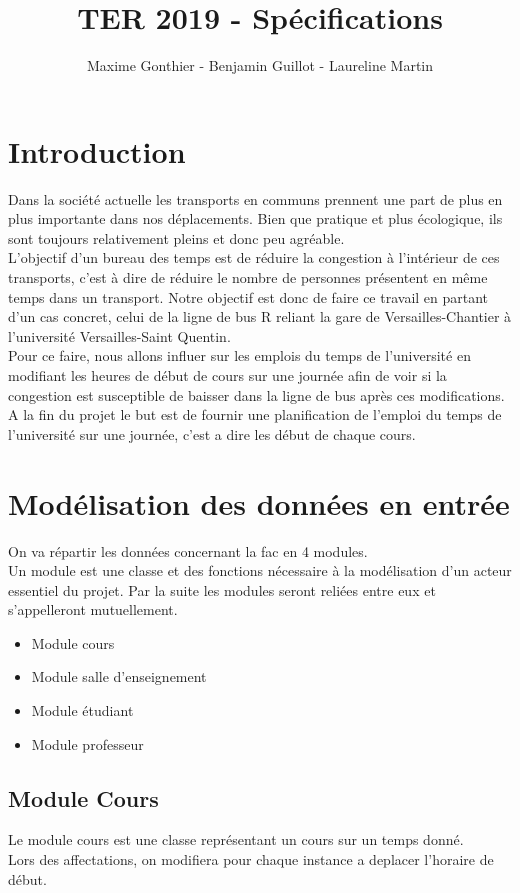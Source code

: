 \documentclass[a4paper,11pt]{article}
\title{TER 2019 - Spécifications}
\author{Maxime Gonthier - Benjamin Guillot - Laureline Martin}
\begin{document}
	\clearpage
	\maketitle

\newpage
\tableofcontents

\newpage
\section{Introduction}
Dans la société actuelle les transports en communs prennent une part de plus en plus importante dans nos déplacements. Bien que pratique et plus écologique, ils sont toujours relativement pleins et donc peu agréable.\\
 L'objectif d'un bureau des temps est de réduire la congestion à l'intérieur de ces transports, c'est à dire de réduire le nombre de personnes présentent en même temps dans un transport. 
Notre objectif est donc de faire ce travail en partant d'un cas concret, celui de la ligne de bus R reliant la gare de Versailles-Chantier à l'université Versailles-Saint Quentin.\\
Pour ce faire, nous allons influer sur les emplois du temps de l'université en modifiant les heures de début de cours sur une journée afin de voir si la congestion est susceptible de baisser dans la ligne de bus après ces modifications.\\
A la fin du projet le but est de fournir une planification de l'emploi du temps de l'université sur une journée, c'est a dire les début de chaque cours.
\section{Modélisation des données en entrée}
	On va répartir les données concernant la fac en 4 modules.\\
	Un module est une classe et des fonctions nécessaire à la modélisation d'un acteur essentiel du projet. Par la suite les modules seront reliées entre eux et s'appelleront mutuellement.
	\begin{itemize}
		\item Module cours
		\item Module salle d'enseignement
		\item Module étudiant
		\item Module professeur
	\end{itemize}
	\subsection{Module Cours}
		Le module cours est une classe représentant un cours sur un temps donné.\\
		Lors des affectations, on modifiera pour chaque instance a deplacer l'horaire de début.\\
\end{document}
